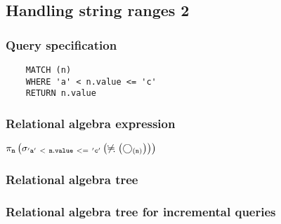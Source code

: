	\subsection{Handling string ranges 2}

	\subsubsection*{Query specification}

	\begin{lstlisting}
	MATCH (n)
	WHERE 'a' < n.value <= 'c'
	RETURN n.value
	\end{lstlisting}


	\subsubsection*{Relational algebra expression}

	$\projection{\var{n}} \left(\selection{\mathtt{'a'~<~n.value~<=~'c'}} \left(\alldifferent{} \left(\getvertices{n}{}\right)\right)\right)$

	\subsubsection*{Relational algebra tree}


	\subsubsection*{Relational algebra tree for incremental queries}

